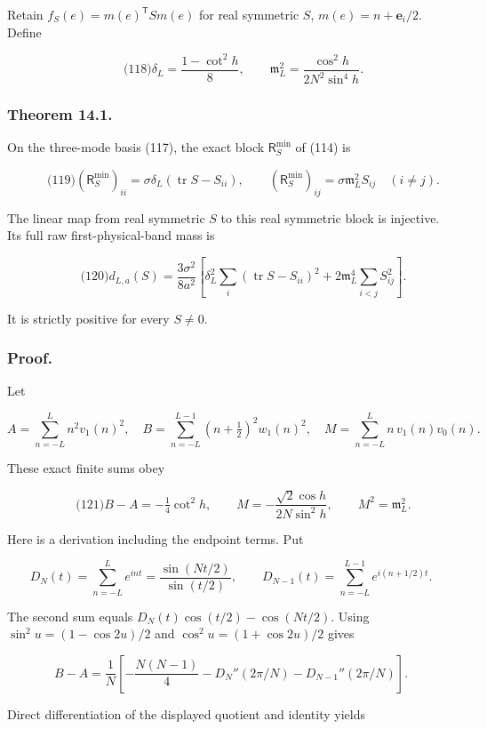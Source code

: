 Retain \(f_S(e)=m(e)^{\mathsf T}S m(e)\) for real symmetric \(S\),
\(m(e)=n+\mathbf e_i/2\). Define

\[
\qquad\text{(118)}
 \delta_L=\frac{1-\cot^2h}{8},\qquad
 \mathfrak m_L^2=\frac{\cos^2h}{2N^2\sin^4h}.
\]

\subsubsection{Theorem 14.1.}\label{fabel-low-mode-transfer-md-theorem-14.1.}

On the three-mode basis (117), the exact block \(\mathsf R_S^{\min}\) of
(114) is

\[
\qquad\text{(119)}
 (\mathsf R_S^{\min})_{ii}=\sigma\delta_L(\operatorname{tr}S-S_{ii}),
 \qquad
 (\mathsf R_S^{\min})_{ij}=\sigma\mathfrak m_L^2S_{ij}\quad(i\ne j).
\]

The linear map from real symmetric \(S\) to this real symmetric block is
injective. Its full raw first-physical-band mass is

\[
\qquad\text{(120)}
 d_{L,a}(S)=\frac{3\sigma^2}{8a^2}
 \left[
 \delta_L^2\sum_i(\operatorname{tr}S-S_{ii})^2+
 2\mathfrak m_L^4\sum_{i<j}S_{ij}^2
 \right].
\]

It is strictly positive for every \(S\ne0\).

\subsubsection{Proof.}\label{fabel-low-mode-transfer-md-proof.}

Let

\[
A=\sum_{n=-L}^Ln^2v_1(n)^2,\quad
 B=\sum_{n=-L}^{L-1}(n+\tfrac12)^2w_1(n)^2,\quad
 M=\sum_{n=-L}^Ln\,v_1(n)v_0(n).
\]

These exact finite sums obey

\[
\qquad\text{(121)}
 B-A=-\tfrac14\cot^2h,\qquad
 M=-\frac{\sqrt2\cos h}{2N\sin^2h},\qquad M^2=\mathfrak m_L^2.
\]

Here is a derivation including the endpoint terms. Put

\[
D_N(t)=\sum_{n=-L}^Le^{int}=\frac{\sin(Nt/2)}{\sin(t/2)},
 \qquad D_{N-1}(t)=\sum_{n=-L}^{L-1}e^{i(n+1/2)t}.
\]

The second sum equals \(D_N(t)\cos(t/2)-\cos(Nt/2)\). Using
\(\sin^2u=(1-\cos2u)/2\) and \(\cos^2u=(1+\cos2u)/2\) gives

\[
B-A=\frac1N\left[
 -\frac{N(N-1)}4-D_N''(2\pi/N)-D_{N-1}''(2\pi/N)\right].
\]

Direct differentiation of the displayed quotient and identity yields

